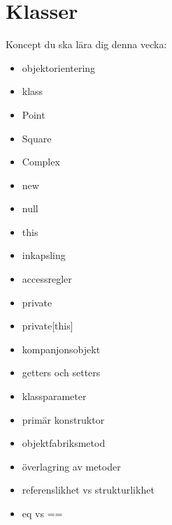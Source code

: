 \chapter{Klasser}\label{chapter:W06}
Koncept du ska lära dig denna vecka:
\begin{multicols}{2}\begin{itemize}[nosep,label={$\square$},leftmargin=*]
\item objektorientering
\item klass
\item Point
\item Square
\item Complex
\item new
\item null
\item this
\item inkapsling
\item accessregler
\item private
\item private[this]
\item kompanjonsobjekt
\item getters och setters
\item klassparameter
\item primär konstruktor
\item objektfabriksmetod
\item överlagring av metoder
\item referenslikhet vs strukturlikhet
\item eq vs ==\end{itemize}\end{multicols}
